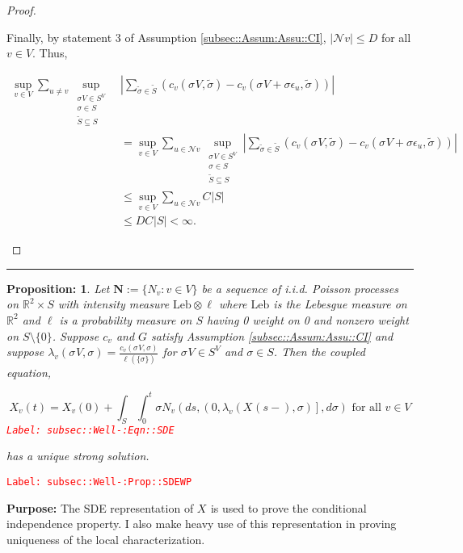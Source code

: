 \documentclass[12pt]{article}
\newcommand{\mb}{\mathbb}
\newcommand{\mc}{\mathcal}
\newcommand{\te}{\text}
\newcommand{\ep}{\epsilon}
\newcommand{\tr}{\textcolor{red}}
\newcommand{\labe}[1]{\tr{\texttt{Label: #1}}}
\newcommand{\purpose}{\textbf{Purpose: }}
\newcommand{\lin}{\rule{\linewidth}{0.4 pt}}
\newcommand{\defeq}{:=}								%
\newcommand{\neigh}{\mc{N}}					%
\renewcommand{\v}{v}							%
\newcommand{\vv}{u}								%
\renewcommand{\S}{S}							%
\newcommand{\s}{\sigma}							%
\newcommand{\sv}[1]{\s^{#1}}					%
\newcommand{\ev}[1]{\ep_{#1}}					%
\renewcommand{\t}{t}							%
\newcommand{\degr}{D}								%
\newcommand{\poiss}[1]{N_{#1}}						%
\newcommand{\poisses}{\mathbf{N}}				%
\newcommand{\leb}{\te{Leb}}							%
\renewcommand{\SS}{\tilde{\S}}						%
\renewcommand{\ss}{\tilde{\s}}					%
\renewcommand{\G}{G}								%
\newcommand{\V}{V}									%
\renewcommand{\tt}{s}								%
\newcommand{\XState}[1]{\S^{#1}}				%
\newcommand{\rxvt}[2]{X_{#1}{(#2)}}					%
\newcommand{\rxvts}[2]{X_{#1}{#2}}					%
\newcommand{\IGr}[1]{c_{#1}}						%
\newcommand{\rate}[1]{\lambda_{#1}}					%
\newcommand{\const}[1]{C_{#1}}						%
\newcommand{\Sm}{\ell}								%
\newtheorem{prop}[thms]{Proposition: }
\begin{document}
\begin{proof}
\begin{enumerate}[i)]
Finally, by statement 3 of Assumption \ref{subsec::Assum:Assu::CI}, \(|\neigh{\v}| \leq \degr\) for all \(\v \in \V\). Thus,

\begin{align*}
\sup_{\v\in \V}\sum_{\vv \neq \v} \sup_{\substack{\sv{}{\V} \in \S^\V\\ \s\in \S\\ \SS\subseteq \S}}& \left|\sum_{\ss \in \SS} (\IGr{\v}(\sv{}{\V},\ss) - \IGr{\v}(\sv{}{\V}+\s\ev{\vv},\ss))\right|\\
&  = \sup_{\v\in \V}\sum_{\vv\in \neigh{\v}} \sup_{\substack{\sv{}{\V} \in \S^\V\\ \s\in \S\\ \SS\subseteq \S}} \left|\sum_{\ss \in \SS} (\IGr{\v}(\sv{}{\V},\ss) - \IGr{\v}(\sv{}{\V}+\s\ev{\vv},\ss))\right|\\
&\leq \sup_{\v\in \V} \sum_{\vv \in \neigh{\v}} \const{}|\S|\\
&\leq \degr \const{}|\S| < \infty.
\end{align*}


\end{enumerate}
\end{proof}

\lin

\begin{prop}
Let \(\poisses \defeq \{\poiss{\v}:\v\in \V\}\) be a sequence of i.i.d. Poisson processes on \(\mb{R}^2\times \S\) with intensity measure \(\leb\otimes \Sm\) where \(\leb\) is the Lebesgue measure on \(\mb{R}^2\) and \(\Sm\) is a probability measure on \(\S\) having 0 weight on 0 and nonzero weight on \(\S\setminus \{0\}\). Suppose \(\IGr{\v}\) and \(\G\) satisfy Assumption \ref{subsec::Assum:Assu::CI} and suppose \(\rate{\v}(\sv{}{\V},\s) = \frac{\IGr{\v}(\sv{}{\V},\s)}{\Sm(\{\s\})}\) for \(\sv{}{\V} \in \S^\V\) and \(\s \in \S\). Then the coupled equation,

\begin{equation}
\rxvt{\v}{\t} = \rxvt{\v}{0} + \int_\S\int_0^\t \s\poiss{\v}\left(d\tt,\left(0,\rate{\v}(\rxvt{}{\tt-},\s)\right],d\s\right) \te{ for all }\v \in \V
\label{subsec::Well-:Eqn::SDE}
\end{equation}
\labe{subsec::Well-:Eqn::SDE}

has a unique strong solution.
\label{subsec::Well-:Prop::SDEWP}
\end{prop}
\labe{subsec::Well-:Prop::SDEWP}

\purpose The SDE representation of \(\rxvts{}{}\) is used to prove the conditional independence property. I also make heavy use of this representation in proving uniqueness of the local characterization.
\end{document}
